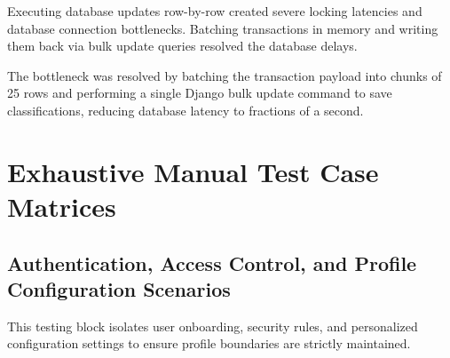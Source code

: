 Executing database updates row-by-row created severe locking latencies and database connection bottlenecks. Batching transactions in memory and writing them back via bulk update queries resolved the database delays.

The bottleneck was resolved by batching the transaction payload into chunks of 25 rows and performing a single Django bulk update command to save classifications, reducing database latency to fractions of a second.

\section{Exhaustive Manual Test Case Matrices}

\subsection{Authentication, Access Control, and Profile Configuration Scenarios}
This testing block isolates user onboarding, security rules, and personalized configuration settings to ensure profile boundaries are strictly maintained.

